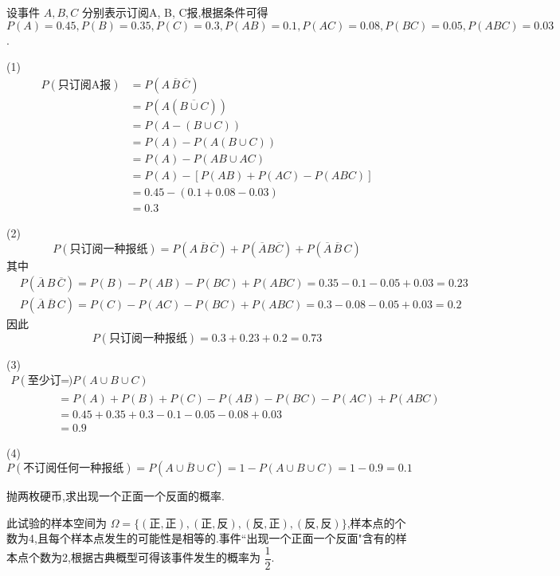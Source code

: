 \begin{solution}
    设事件 $A,B,C$ 分别表示订阅A, B, C报,根据条件可得 $P(A)=0.45, P(B)=0.35, P(C)=0.3, P(AB)=0.1, P(AC)=0.08, P(BC)=0.05, P(ABC)=0.03$.

    (1)
    $$
    \begin{aligned}
        P(\text{只订阅A报}) &= P(A \, \overline{B} \, \overline{C}) \\
        &= P(A (\overline{B \cup C})) \\
        &= P(A - (B \cup C)) \\
        &= P(A) - P(A(B \cup C)) \\
        &= P(A) - P(AB \cup AC) \\
        &= P(A) - [P(AB) + P(AC) - P(ABC)] \\
        &= 0.45 - (0.1+0.08-0.03) \\
        &= 0.3
    \end{aligned}
    $$

    (2)
    $$
    P(\text{只订阅一种报纸}) = P(A \, \overline{B} \, \overline{C}) + P(\overline{A} B \overline{C}) + P(\overline{A} \, \overline{B} \, C)
    $$
    其中
    $$
    \begin{aligned}
        & P(\overline{A} \, B \, \overline{C}) = P(B) - P(AB) - P(BC) + P(ABC) = 0.35-0.1-0.05+0.03 = 0.23 \\
        & P(\overline{A} \, \overline{B} \, C) = P(C) - P(AC) - P(BC) + P(ABC) = 0.3-0.08-0.05+0.03 = 0.2
    \end{aligned}
    $$
    因此
    $$
    P(\text{只订阅一种报纸}) = 0.3 + 0.23 + 0.2 = 0.73
    $$

    (3)
    $$
    \begin{aligned}
        P(\text{至少订阅一种报纸}) &= P(A \cup B \cup C) \\
        &= P(A) + P(B) + P(C) - P(AB) - P(BC) - P(AC) + P(ABC) \\
        &= 0.45 + 0.35 + 0.3 - 0.1 - 0.05 - 0.08 + 0.03 \\
        &=0.9
    \end{aligned}
    $$

    (4) $P(\text{不订阅任何一种报纸}) = P(\overline{A \cup B \cup C}) = 1 - P(A \cup B \cup C) = 1-0.9 = 0.1$
\end{solution}


\question 抛两枚硬币,求出现一个正面一个反面的概率.

\begin{solution}
    此试验的样本空间为 $\varOmega = \{ (\text{正}, \text{正}), (\text{正}, \text{反}), (\text{反}, \text{正}), (\text{反}, \text{反}) \}$,样本点的个数为4,且每个样本点发生的可能性是相等的.事件``出现一个正面一个反面"含有的样本点个数为2,根据古典概型可得该事件发生的概率为 $\dfrac{1}{2}$.
\end{solution}

